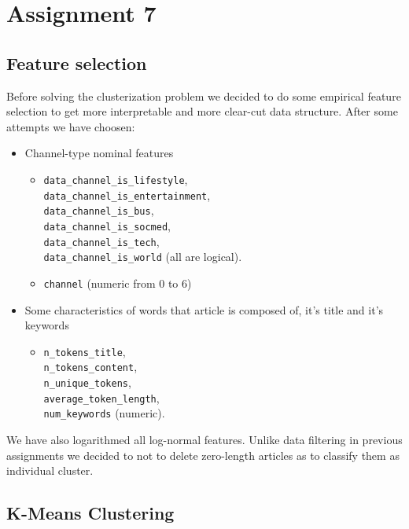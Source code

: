 \section{Assignment 7}
\subsection{Feature selection}

Before solving the clusterization problem we decided to do some empirical feature selection to get more interpretable and more clear-cut data structure. 
After some attempts we have choosen:
\begin{itemize}
	\item
	Channel-type nominal features
	
	\begin{itemize}
		\item
		\texttt{data\_channel\_is\_lifestyle}, \\
		\texttt{data\_channel\_is\_entertainment}, \\ 
		\texttt{data\_channel\_is\_bus}, \\ 
		\texttt{data\_channel\_is\_socmed}, \\
		\texttt{data\_channel\_is\_tech}, \\
		\texttt{data\_channel\_is\_world} (all are logical).
		
		\item
		\texttt{channel} (numeric from 0 to 6)
	\end{itemize}
	\item
	Some characteristics of words that article is composed of, it's title and it's keywords
	
	\begin{itemize}
		\item
		\texttt{n\_tokens\_title}, \\
		\texttt{n\_tokens\_content}, \\
		\texttt{n\_unique\_tokens}, \\
		\texttt{average\_token\_length}, \\
		\texttt{num\_keywords} (numeric).
	\end{itemize}
\end{itemize}

We have also logarithmed all log-normal features.
Unlike data filtering in previous assignments we decided to not to delete zero-length articles as to classify them as individual cluster.


\subsection{K-Means Clustering}

